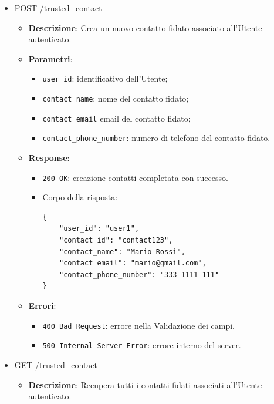 \documentclass[a4paper,12pt]{article}
\newcommand{\code}[1]{{\ttfamily\textcolor{purple!85!black}{#1}}}
\begin{document}
\begin{itemize}
    \item \code{POST /trusted\_contact}
        \begin{itemize}
            \item \textbf{Descrizione}: Crea un nuovo contatto fidato associato all’Utente autenticato.

            \item \textbf{Parametri}:
            \begin{itemize}
                \item \texttt{user\_id}: identificativo dell’Utente;
                \item \texttt{contact\_name}: nome del contatto fidato;
                \item \texttt{contact\_email} email del contatto fidato;
                \item \texttt{contact\_phone\_number}: numero di telefono del contatto fidato.
            \end{itemize}

            \item \textbf{Response}:
            \begin{itemize}
                \item \texttt{200 OK}: creazione contatti completata con successo.
                \item Corpo della risposta:
\begin{verbatim}
{
    "user_id": "user1",
    "contact_id": "contact123",
    "contact_name": "Mario Rossi",
    "contact_email": "mario@gmail.com",
    "contact_phone_number": "333 1111 111"
}
\end{verbatim}
            \end{itemize}

            \item \textbf{Errori}:
            \begin{itemize}
                \item \texttt{400 Bad Request}: errore nella Validazione dei campi.
                \item \texttt{500 Internal Server Error}: errore interno del server.
            \end{itemize}
        \end{itemize}

    \item \code{GET /trusted\_contact}
        \begin{itemize}
            \item \textbf{Descrizione}: Recupera tutti i contatti fidati associati all'Utente autenticato.
            

\end{itemize}
\end{itemize}
\end{document}
